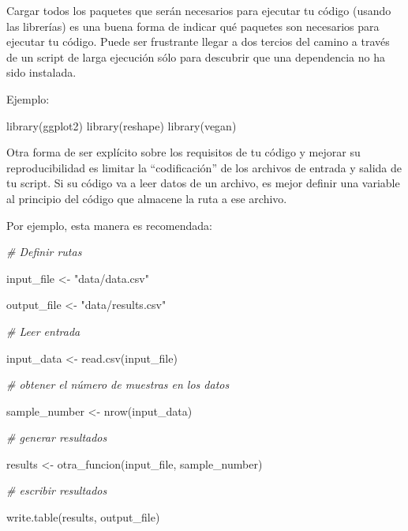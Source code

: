 \documentclass[
]{book}
\newenvironment{Shaded}{\begin{snugshade}}{\end{snugshade}}
\newcommand{\CommentTok}[1]{\textcolor[rgb]{0.56,0.35,0.01}{\textit{#1}}}
\newcommand{\FunctionTok}[1]{\textcolor[rgb]{0.00,0.00,0.00}{#1}}
\newcommand{\NormalTok}[1]{#1}
\newcommand{\OtherTok}[1]{\textcolor[rgb]{0.56,0.35,0.01}{#1}}
\newcommand{\StringTok}[1]{\textcolor[rgb]{0.31,0.60,0.02}{#1}}
\begin{document}
Cargar todos los paquetes que serán necesarios para ejecutar tu código (usando las librerías) es una buena forma de indicar qué paquetes son necesarios para ejecutar tu código. Puede ser frustrante llegar a dos tercios del camino a través de un script de larga ejecución sólo para descubrir que una dependencia no ha sido instalada.

Ejemplo:

\begin{Shaded}
\begin{Highlighting}[]
\FunctionTok{library}\NormalTok{(ggplot2)}
\FunctionTok{library}\NormalTok{(reshape)}
\FunctionTok{library}\NormalTok{(vegan)}
\end{Highlighting}
\end{Shaded}

Otra forma de ser explícito sobre los requisitos de tu código y mejorar su reproducibilidad es limitar la ``codificación'' de los archivos de entrada y salida de tu script. Si su código va a leer datos de un archivo, es mejor definir una variable al principio del código que almacene la ruta a ese archivo.

Por ejemplo, esta manera es recomendada:

\begin{Shaded}
\begin{Highlighting}[]
\CommentTok{\# Definir rutas}

\NormalTok{input\_file }\OtherTok{\textless{}{-}} \StringTok{"data/data.csv"} 

\NormalTok{output\_file }\OtherTok{\textless{}{-}} \StringTok{"data/results.csv"}

\CommentTok{\# Leer entrada}

\NormalTok{input\_data }\OtherTok{\textless{}{-}} \FunctionTok{read.csv}\NormalTok{(input\_file)}

\CommentTok{\# obtener el número de muestras en los datos}

\NormalTok{sample\_number }\OtherTok{\textless{}{-}} \FunctionTok{nrow}\NormalTok{(input\_data)}

\CommentTok{\# generar resultados}

\NormalTok{results }\OtherTok{\textless{}{-}} \FunctionTok{otra\_funcion}\NormalTok{(input\_file, sample\_number)}

\CommentTok{\# escribir resultados}

\FunctionTok{write.table}\NormalTok{(results, output\_file)}
\end{Highlighting}
\end{Shaded}
\end{document}
